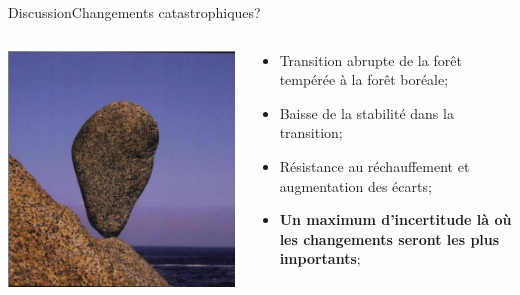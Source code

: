 \documentclass[10pt,aspectratio=149]{beamer}
\begin{document}
   \begin{frame}{Discussion}{Changements catastrophiques?}
      \begin{columns}
         \begin{column}{0.5\textwidth}
            \begin{center}
               \includegraphics[height=0.6\textheight]{Figs/scheffer}
            \end{center}
         \end{column}
         \begin{column}{0.5\textwidth}
            \begin{itemize}
               \item Transition abrupte de la forêt tempérée à la forêt boréale;
               \item Baisse de la stabilité dans la transition;
               \item Résistance au réchauffement et augmentation des écarts;
               \item \textbf{Un maximum d'incertitude là où les changements seront les plus importants};
            \end{itemize}
         \end{column}
      \end{columns}  
   \end{frame}
\end{document}
